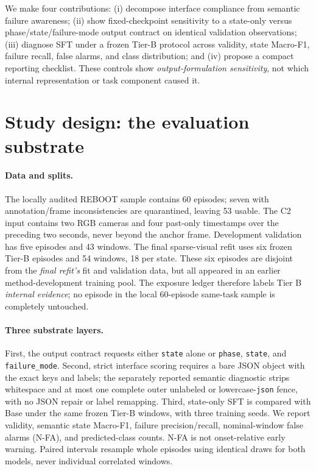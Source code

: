 \documentclass{article}
\begin{document}
We make four contributions: (i) decompose interface compliance from semantic failure awareness; (ii) show fixed-checkpoint sensitivity to a state-only versus phase/state/failure-mode output contract on identical validation observations; (iii) diagnose SFT under a frozen Tier-B protocol across validity, state Macro-F1, failure recall, false alarms, and class distribution; and (iv) propose a compact reporting checklist. These controls show \emph{output-formulation sensitivity}, not which internal representation or task component caused it.

\section{Study design: the evaluation substrate}
\paragraph{Data and splits.}
The locally audited REBOOT sample contains 60 episodes; seven with annotation/frame inconsistencies are quarantined, leaving 53 usable. The C2 input contains two RGB cameras and four past-only timestamps over the preceding two seconds, never beyond the anchor frame. Development validation has five episodes and 43 windows. The final sparse-visual refit uses six frozen Tier-B episodes and 54 windows, 18 per state. These six episodes are disjoint from the \emph{final refit's} fit and validation data, but all appeared in an earlier method-development training pool. The exposure ledger therefore labels Tier B \emph{internal evidence}; no episode in the local 60-episode same-task sample is completely untouched.

\paragraph{Three substrate layers.}
First, the output contract requests either \texttt{state} alone or \texttt{phase}, \texttt{state}, and \texttt{failure\_mode}. Second, strict interface scoring requires a bare JSON object with the exact keys and labels; the separately reported semantic diagnostic strips whitespace and at most one complete outer unlabeled or lowercase-\texttt{json} fence, with no JSON repair or label remapping. Third, state-only SFT is compared with Base under the same frozen Tier-B windows, with three training seeds. We report validity, semantic state Macro-F1, failure precision/recall, nominal-window false alarms (N-FA), and predicted-class counts. N-FA is not onset-relative early warning. Paired intervals resample whole episodes using identical draws for both models, never individual correlated windows.
\end{document}
